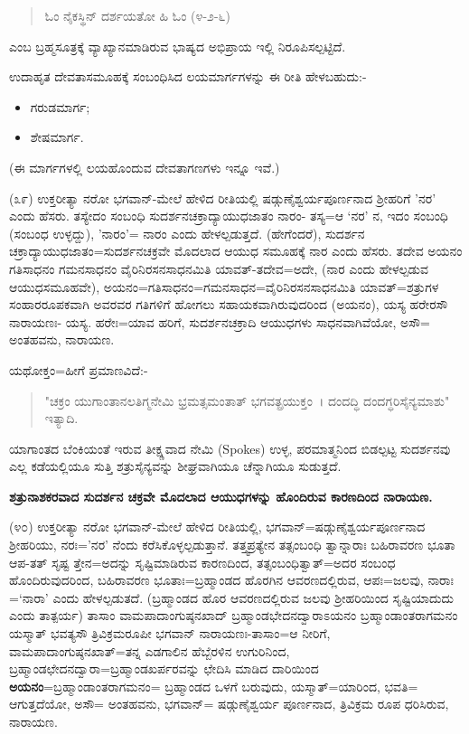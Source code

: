 \begin{verse}
ಓಂ ನೈಕಸ್ಥಿನ್ ದರ್ಶಯತೋ ಹಿ ಓಂ (೪-೨-೬)
\end{verse}

\noindent
ಎಂಬ ಬ್ರಹ್ಮಸೂತ್ರಕ್ಕೆ ವ್ಯಾಖ್ಯಾನಮಾಡಿರುವ ಭಾಷ್ಯದ ಅಭಿಪ್ರಾಯ ಇಲ್ಲಿ ನಿರೂಪಿಸಲ್ಪಟ್ಟಿದೆ.

ಉದಾಹೃತ ದೇವತಾಸಮೂಹಕ್ಕೆ ಸಂಬಂಧಿಸಿದ ಲಯಮಾರ್ಗಗಳನ್ನು ಈ ರೀತಿ ಹೇಳಬಹುದು:-

\begin{itemize}
\item ಗರುಡಮಾರ್ಗ;

 \item ಶೇಷಮಾರ್ಗ.

\end{itemize}

(ಈ ಮಾರ್ಗಗಳಲ್ಲಿ ಲಯಹೊಂದುವ ದೇವತಾಗಣಗಳು ಇನ್ನೂ ಇವೆ.)

(೩೯) ಉಕ್ತರೀತ್ಯಾ ನರೋ ಭಗವಾನ್-ಮೇಲೆ ಹೇಳಿದ ರೀತಿಯಲ್ಲಿ ಷಡ್ಗುಣೈಶ್ವರ್ಯಪೂರ್ಣನಾದ ಶ‍್ರೀಹರಿಗೆ 'ನರ' ಎಂದು ಹೆಸರು. ತಸ್ಯೇದಂ ಸಂಬಂಧಿ ಸುದರ್ಶನಚಕ್ರಾದ್ಯಾಯುಧಜಾತಂ ನಾರಂ- ತಸ್ಯ=ಆ `ನರ' ನ, ಇದಂ ಸಂಬಂಧಿ (ಸಂಬಂಧ ಉಳ್ಳದ್ದು), 'ನಾರಂ'= ನಾರಂ ಎಂದು ಹೇಳಲ್ಪಡುತ್ತದೆ. (ಹೇಗೆಂದರೆ), ಸುದರ್ಶನ ಚಕ್ರಾದ್ಯಾಯುಧಜಾತಂ=ಸುದರ್ಶನಚಕ್ರವೇ ಮೊದಲಾದ ಆಯುಧ ಸಮೂಹಕ್ಕೆ ನಾರ ಎಂದು ಹೆಸರು. ತದೇವ ಅಯನಂ ಗತಿಸಾಧನಂ ಗಮನಸಾಧನಂ ವೈರಿನಿರಸನಸಾಧನಮಿತಿ ಯಾವತ್-ತದೇವ=ಅದೇ, (ನಾರ ಎಂದು ಹೇಳಲ್ಪಡುವ ಆಯುಧಸಮೂಹವೇ), ಅಯನಂ=ಗತಿಸಾಧನಂ=ಗಮನಸಾಧನ=ವೈರಿನಿರಸನಸಾಧನಮಿತಿ ಯಾವತ್=ಶತ್ರುಗಳ ಸಂಹಾರರೂಪಕವಾಗಿ ಅವರವರ ಗತಿಗಳಿಗೆ ಹೋಗಲು ಸಹಾಯಕವಾಗಿರುವುದರಿಂದ (ಅಯನಂ), ಯಸ್ಯ ಹರೇರಸೌ‌ ನಾರಾಯಣಃ- ಯಸ್ಯ. ಹರೇಃ=ಯಾವ ಹರಿಗೆ, ಸುದರ್ಶನಚಕ್ರಾದಿ ಆಯುಧಗಳು ಸಾಧನವಾಗಿವೆಯೋ, ಅಸೌ= ಅಂತಹವನು, ನಾರಾಯಣ.

ಯಥೋಕ್ತಂ=ಹೀಗೆ ಪ್ರಮಾಣವಿದೆ:-

\begin{verse}
"ಚಕ್ರಂ ಯುಗಾಂತಾನಲತಿಗ್ಮನೇಮಿ ಭ್ರಮತ್ಸಮಂತಾತ್ ಭಗವತ್ಪ್ರಯುಕ್ತಂ~। ದಂದದ್ಧಿ ದಂದಗ್ಧರಿಸೈನ್ಯಮಾಶು" ಇತ್ಯಾದಿ.
\end{verse}

\noindent
ಯಾಗಾಂತದ ಬೆಂಕಿಯಂತೆ ಇರುವ ತೀಕ್ಷ್ಣವಾದ ನೇಮಿ (Spokes) ಉಳ್ಳ, ಪರಮಾತ್ಮನಿಂದ ಬಿಡಲ್ಪಟ್ಟ ಸುದರ್ಶನವು ಎಲ್ಲ ಕಡೆಯಲ್ಲಿಯೂ ಸುತ್ತಿ ಶತ್ರುಸೈನ್ಯವನ್ನು ಶೀಘ್ರವಾಗಿಯೂ ಚೆನ್ನಾಗಿಯೂ ಸುಡುತ್ತದೆ.

\begin{center}
\textbf{ಶತ್ರುನಾಶಕರವಾದ ಸುದರ್ಶನ ಚಕ್ರವೇ ಮೊದಲಾದ ಆಯುಧಗಳನ್ನು ಹೊಂದಿರುವ ಕಾರಣದಿಂದ ನಾರಾಯಣ.}
\end{center}

(೪೦) ಉಕ್ತರೀತ್ಯಾ ನರೋ ಭಗವಾನ್-ಮೇಲೆ ಹೇಳಿದ ರೀತಿಯಲ್ಲಿ, ಭಗವಾನ್=ಷಡ್ಗುಣೈಶ್ವರ್ಯಪೂರ್ಣನಾದ ಶ‍್ರೀಹರಿಯು, ನರಃ='ನರ' ನೆಂದು ಕರೆಸಿಕೊಳ್ಳಲ್ಪಡುತ್ತಾನೆ. ತತ್ತ್ವಪ್ರತ್ಯೇನ ತತ್ಸಂಬಂಧಿ ತ್ವಾನ್ನಾರಾಃ ಬಹಿರಾವರಣ ಭೂತಾ ಆಪ-ತತ್ ಸೃಷ್ಟ ತ್ತೇನ=ಅದನ್ನು ಸೃಷ್ಟಿಮಾಡಿರುವ ಕಾರಣದಿಂದ, ತತ್ಸಂಬಂಧಿತ್ವಾತ್=ಅದರ ಸಂಬಂಧ ಹೊಂದಿರುವುದರಿಂದ, ಬಹಿರಾವರಣ ಭೂತಾಃ=ಬ್ರಹ್ಮಾಂಡದ ಹೊರಗಿನ ಆವರಣದಲ್ಲಿರುವ, ಆಪಃ=ಜಲವು, ನಾರಾಃ =`ನಾರಾ' ಎಂದು ಹೇಳಲ್ಪಡುತದೆ. (ಬ್ರಹ್ಮಾಂಡದ ಹೊರ ಆವರಣದಲ್ಲಿರುವ ಜಲವು ಶ‍್ರೀಹರಿಯಿಂದ ಸೃಷ್ಟಿಯಾದುದು ಎಂದು ತಾತ್ಪರ್ಯ) ತಾಸಾಂ ವಾಮಪಾದಾಂಗುಷ್ಠನಖಾದ್ ಬ್ರಹ್ಮಾಂಡಭೇದನದ್ವಾರಾಽಯನಂ ಬ್ರಹ್ಮಾಂಡಾಂತರಾಗಮನಂ ಯಸ್ಮಾತ್ ಭವತ್ಯಸೌ ತ್ರಿವಿಕ್ರಮರೂಪೀ ಭಗವಾನ್ ನಾರಾಯಣಃ-ತಾಸಾಂ=ಆ ನೀರಿಗೆ, ವಾಮಪಾದಾಂಗುಷ್ಠನಖಾತ್=ತನ್ನ ಎಡಗಾಲಿನ ಹೆಬ್ಬೆರಳಿನ ಉಗುರಿನಿಂದ, ಬ್ರಹ್ಮಾಂಡಛೇದನದ್ವಾರಾ=ಬ್ರಹ್ಮಾಂಡಖರ್ಪರವನ್ನು ಛೇದಿಸಿ ಮಾಡಿದ ದಾರಿಯಿಂದ \textbf{ಅಯನಂ}=ಬ್ರಹ್ಮಾಂಡಾಂತರಾಗಮನಂ= ಬ್ರಹ್ಮಾಂಡದ ಒಳಗೆ ಬರುವುದು, ಯಸ್ಮಾತ್=ಯಾರಿಂದ, ಭವತಿ= ಆಗುತ್ತದೆಯೋ, ಅಸೌ= ಅಂತಹವನು, ಭಗವಾನ್= ಷಡ್ಗುಣೈಶ್ವರ್ಯ ಪೂರ್ಣನಾದ, ತ್ರಿವಿಕ್ರಮ ರೂಪ ಧರಿಸಿರುವ, ನಾರಾಯಣ.

